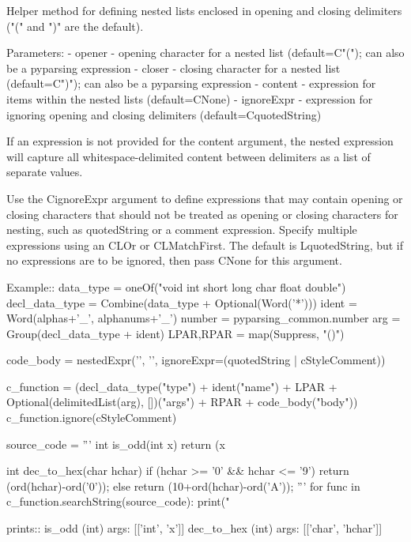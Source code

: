\begin{DoxyVerb}Helper method for defining nested lists enclosed in opening and closing
delimiters ("(" and ")" are the default).

Parameters:
 - opener - opening character for a nested list (default=C{"("}); can also be a pyparsing expression
 - closer - closing character for a nested list (default=C{")"}); can also be a pyparsing expression
 - content - expression for items within the nested lists (default=C{None})
 - ignoreExpr - expression for ignoring opening and closing delimiters (default=C{quotedString})

If an expression is not provided for the content argument, the nested
expression will capture all whitespace-delimited content between delimiters
as a list of separate values.

Use the C{ignoreExpr} argument to define expressions that may contain
opening or closing characters that should not be treated as opening
or closing characters for nesting, such as quotedString or a comment
expression.  Specify multiple expressions using an C{L{Or}} or C{L{MatchFirst}}.
The default is L{quotedString}, but if no expressions are to be ignored,
then pass C{None} for this argument.

Example::
    data_type = oneOf("void int short long char float double")
    decl_data_type = Combine(data_type + Optional(Word('*')))
    ident = Word(alphas+'_', alphanums+'_')
    number = pyparsing_common.number
    arg = Group(decl_data_type + ident)
    LPAR,RPAR = map(Suppress, "()")

    code_body = nestedExpr('{', '}', ignoreExpr=(quotedString | cStyleComment))

    c_function = (decl_data_type("type") 
                  + ident("name")
                  + LPAR + Optional(delimitedList(arg), [])("args") + RPAR 
                  + code_body("body"))
    c_function.ignore(cStyleComment)
    
    source_code = '''
        int is_odd(int x) { 
            return (x%
        }
            
        int dec_to_hex(char hchar) { 
            if (hchar >= '0' && hchar <= '9') { 
                return (ord(hchar)-ord('0')); 
            } else { 
                return (10+ord(hchar)-ord('A'));
            } 
        }
    '''
    for func in c_function.searchString(source_code):
        print("%

prints::
    is_odd (int) args: [['int', 'x']]
    dec_to_hex (int) args: [['char', 'hchar']]
\end{DoxyVerb}
 \mbox{\label{namespacepkg__resources_1_1__vendor_1_1pyparsing_a6531de2633eaf1f99f2223c323136e4c}} 
